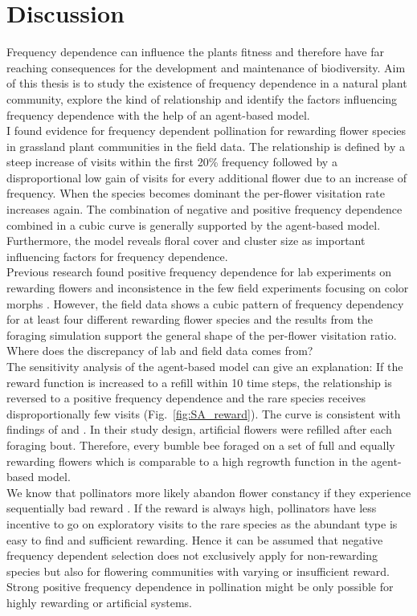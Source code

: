 \label{ch:discussion}
\section{Discussion}
Frequency dependence can influence the plants fitness and therefore have far reaching consequences for the development and maintenance of biodiversity. Aim of this thesis is to study the existence of frequency dependence in a natural plant community, explore the kind of relationship and identify the factors influencing frequency dependence with the help of an agent-based model.\\
I found evidence for frequency dependent pollination for rewarding flower species in grassland plant communities in the field data. The relationship is defined by a steep increase of visits within the first 20\% frequency followed by a disproportional low gain of visits for every additional flower due to an increase of frequency. When the species becomes dominant the per-flower visitation rate increases again. The combination of negative and positive frequency dependence combined in a cubic curve is generally supported by the agent-based model. Furthermore, the model reveals floral cover and cluster size as important influencing factors for frequency dependence. \\


Previous research found positive frequency dependence for lab experiments on rewarding flowers and inconsistence in the few field experiments focusing on color morphs \citep{smithson2001pollinator}. However, the field data shows a cubic pattern of frequency dependency for at least four different rewarding flower species and the results from the foraging simulation support the general shape of the per-flower visitation ratio. Where does the discrepancy of lab and field data comes from?\\ 

The sensitivity analysis of the agent-based model can give an explanation: If the reward function is increased to a refill within 10 time steps, the relationship is reversed to a positive frequency dependence and the rare species receives disproportionally few visits (Fig.~\ref{fig:SA_reward}). The curve is consistent with findings of  \cite{smithson1997density} and \cite{smithson1996frequency}. In their study design, artificial flowers were refilled after each foraging bout. Therefore, every bumble bee foraged on a set of full and equally rewarding flowers which is comparable to a high regrowth function in the agent-based model.\\
We know that pollinators more likely abandon flower constancy if they experience sequentially bad reward \citep{chittka1997foraging,goulson1994model}. If the reward is always high, pollinators have less incentive to go on exploratory visits to the rare species as the abundant type is easy to find and sufficient rewarding. Hence it can be assumed that negative frequency dependent selection does not exclusively apply for non-rewarding species but also for flowering communities with varying or insufficient reward. Strong positive frequency dependence in pollination might be only possible for highly rewarding or artificial systems. 

